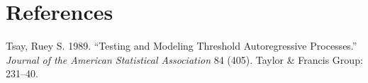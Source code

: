 \documentclass[11pt,preprint, authoryear]{elsarticle}
\numberwithin{equation}{section}
\numberwithin{figure}{section}
\numberwithin{table}{section}
\begin{document}
\section*{\texorpdfstring{References
\label{References}}{References }}\label{references}

\hypertarget{refs}{}
\hypertarget{ref-Tsay1989}{}
Tsay, Ruey S. 1989. ``Testing and Modeling Threshold Autoregressive
Processes.'' \emph{Journal of the American Statistical Association} 84
(405). Taylor \& Francis Group: 231--40.




\end{document}
